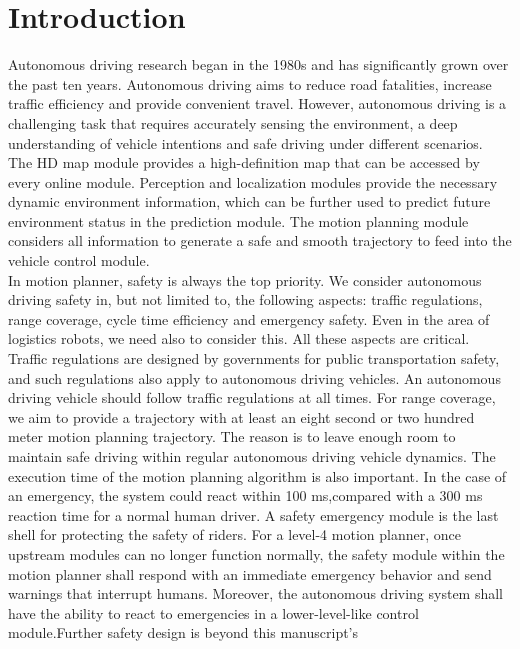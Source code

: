 \documentclass{report}
\begin{document}
 \chapter*{Introduction}
 Autonomous driving research began in the 1980s and has significantly grown over the past ten years. Autonomous driving aims to reduce road fatalities, increase traffic efficiency and provide convenient travel. However, autonomous driving is a challenging task that requires accurately sensing the environment, a deep understanding of vehicle intentions and safe driving under different scenarios.\\
 \indent
 The HD map module provides a
 high-definition map that can be accessed by every online module. Perception and localization modules provide the necessary dynamic environment information, which can be further used to predict future environment status in the prediction module. The motion planning module considers all information to generate a safe and smooth trajectory to feed into the vehicle control module.\\
 \indent
 In motion planner, safety is always the top priority. We consider autonomous driving safety in, but not limited to, the following aspects: traffic regulations, range coverage, cycle time efficiency and emergency safety. Even in the area of logistics robots, we need also to consider this. All these aspects are critical. Traffic regulations are designed by governments for public transportation safety, and such regulations also apply to autonomous driving vehicles. An autonomous driving vehicle should follow traffic regulations at all times. For range coverage, we aim to provide a trajectory with at least an eight second or two hundred meter motion planning trajectory. The reason is to leave enough room to maintain safe driving within regular autonomous driving vehicle dynamics. The execution time of the motion planning algorithm is also important. In the case of an emergency, the system could react within 100 ms,compared with a 300 ms reaction time for a normal human driver.
 A safety emergency module is the last shell for protecting the safety of riders. For a level-4 motion planner, once upstream modules can no longer function normally, the safety module within the motion planner shall respond with an immediate emergency behavior and send warnings that interrupt humans. Moreover, the autonomous driving system shall have the ability to react to emergencies in a lower-level-like control module.Further safety design is beyond this manuscript’s
\end{document}
